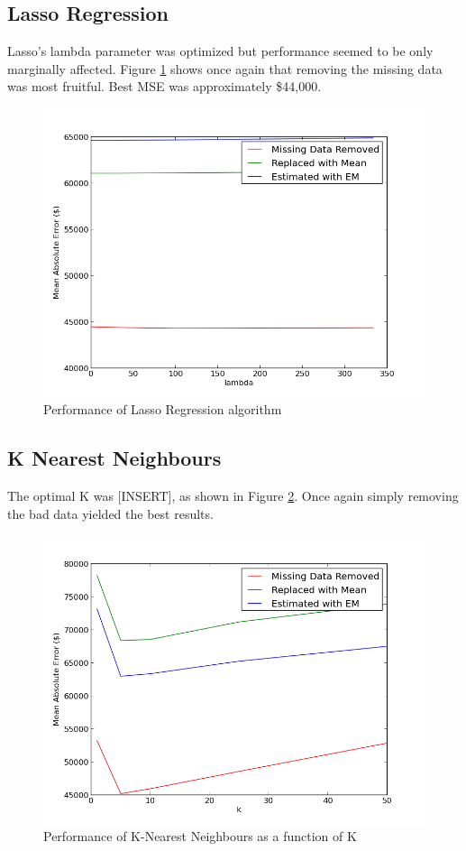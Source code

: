 \documentclass{acm_proc_article-sp}
\begin{document}
\subsection{Lasso Regression}
	Lasso's lambda parameter was optimized but performance seemed to be only marginally affected. Figure \ref{fig:lassoreg} shows once again that removing the missing data was most fruitful. Best MSE was approximately \$44,000.
	
	 \begin{figure}[!htbp]
   		\centering
  		\includegraphics[width=\linewidth]{lasso_tuning_plot.png}
    		\caption{Performance of Lasso Regression algorithm}
    		\label{fig:lassoreg}
	\end{figure}
	
\subsection{K Nearest Neighbours}
	The optimal K was [INSERT], as shown in Figure \ref{fig:knn}. Once again simply removing the bad data yielded the best results. 
	
	\begin{figure}[!htbp]
   		\centering
  		\includegraphics[width=\linewidth]{knn_tuning.png}
    		\caption{Performance of K-Nearest Neighbours as a function of K}
    		\label{fig:knn}
	\end{figure}
\end{document}
